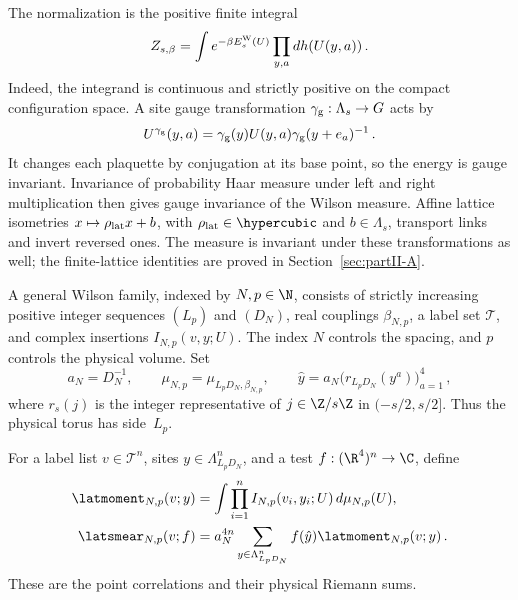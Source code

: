 The normalization is the positive finite integral
\begin{equation*}
Z_{s,\beta}=\int e^{-\beta E_s^{\rm W}(U)}\prod_{y,a}dh(U(y,a))\,.
\end{equation*}
Indeed, the integrand is continuous and strictly positive on the compact configuration space. A site gauge transformation $\gamma_{\rm g}:\Lambda_s\to G$ acts by
\begin{equation*}
U^{\gamma_{\rm g}}(y,a)=\gamma_{\rm g}(y)U(y,a)\gamma_{\rm g}(y+e_a)^{-1}\,.
\end{equation*}
It changes each plaquette by conjugation at its base point, so the energy is gauge invariant. Invariance of probability Haar measure under left and right multiplication then gives gauge invariance of the Wilson measure. Affine lattice isometries $x\mapsto\rho_{\rm lat}x+b$, with $\rho_{\rm lat}\in\hypercubic$ and $b\in\Lambda_s$, transport links and invert reversed ones. The measure is invariant under these transformations as well; the finite-lattice identities are proved in Section~\ref{sec:partII-A}.

A general Wilson family, indexed by $N,p\in\N$, consists of strictly increasing positive integer sequences $(L_p)$ and $(D_N)$, real couplings $\beta_{N,p}$, a label set $\mathcal T$, and complex insertions $I_{N,p}(v,y;U)$. The index $N$ controls the spacing, and $p$ controls the physical volume. Set
\begin{equation}\label{eq:I12-physical-placement}
a_N=D_N^{-1},\qquad
\mu_{N,p}=\mu_{L_pD_N,\beta_{N,p}},\qquad
\hat y=a_N\bigl(r_{L_pD_N}(y^a)\bigr)_{a=1}^4\,,
\end{equation}
where $r_s(j)$ is the integer representative of $j\in\Z/s\Z$ in $(-s/2,s/2]$. Thus the physical torus has side~$L_p$.

\begin{definition}\label{def:D03}
For a label list $v\in\mathcal T^n$, sites $y\in\Lambda_{L_pD_N}^n$, and a test $f:(\R^4)^n\to\C$, define
\begin{align*}
\latmoment_{N,p}(v;y)&=\int\prod_{i=1}^n I_{N,p}(v_i,y_i;U)\,d\mu_{N,p}(U),\\
\latsmear_{N,p}(v;f)&=a_N^{4n}\sum_{y\in\Lambda_{L_pD_N}^n}f(\hat y)\latmoment_{N,p}(v;y)\,.
\end{align*}
These are the point correlations and their physical Riemann sums.
\end{definition}

